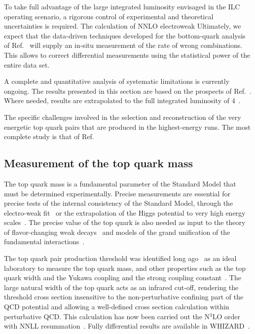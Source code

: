 To take full advantage of the large integrated luminosity envisaged in the ILC 
operating scenario, a rigorous control of experimental and theoretical uncertainties 
is required. The calculation of NNLO electroweak Ultimately, we expect that the data-driven techniques developed for the bottom-quark
analysis of Ref.~\cite{Bilokin:2017lco, bilokin:tel-01946099} will supply an 
in-situ measurement of the rate of wrong combinations. This allows to correct
differential measurements using the statistical power of the entire data set. 

A complete and quantitative analysis of systematic limitations is currently 
ongoing. The results presented in this section are based on the
prospects of Ref.~\cite{Amjad:2015mma,Bernreuther:2017cyi,Abramowicz:2018rjq}.
Where needed, results are extrapolated to the full integrated luminosity of
4~\iab.

The specific challenges involved in the selection and reconstruction of the very 
energetic top quark pairs that are produced in the highest-energy runs. The most
complete study is that of Ref.~\cite{Abramowicz:2018rjq}


\subsection{Measurement of the top quark mass}
\label{subsec:top:topmass}

The top quark mass is a fundamental parameter of the Standard Model that must be
determined experimentally. Precise measurements are essential for precise tests of
the internal consistency of the Standard Model, through the electro-weak
fit~\cite{Baak:2014ora} or the extrapolation of the Higgs potential to
very high energy
scales~\cite{Degrassi:2012ry}.   The precise value of the top quark is
also needed as input to the theory of flavor-changing weak
decays~\cite{Buras:2009if} and models of the grand unification of the
fundamental interactions~\cite{Langacker:1994vf}.

The top quark pair production threshold was identified long ago~\cite{Gusken:1985nf} as
an ideal laboratory to measure the top quark mass, and other properties such as the top quark
width and the Yukawa coupling and the strong coupling constant~\cite{Strassler:1990nw}.
The large natural width of the top quark acts as an infrared cut-off,
rendering the threshold cross section insensitive to the non-perturbative confining part
of the QCD potential and allowing a well-defined  cross section
calculation within  perturbative QCD.  This calculation has now been
carried out the N$^3$LO order~\cite{Beneke:2015kwa} with  NNLL resummation~\cite{Hoang:2013uda}. Fully differential results are available in WHIZARD~\cite{Bach:2017ggt}.

